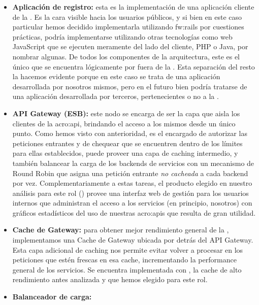 \begin{itemize}
  \item \textbf{Aplicación de registro:} esta es la implementación de una aplicación cliente de la {\cloud}. Es la cara visible hacia los usuarios públicos, y si bien en este caso particular hemos decidido implementarla utilizando \gls{fw:rails} por cuestiones prácticas, podría implementarse utilizando otras tecnologías como  web JavaScript que se ejecuten meramente del lado del cliente, PHP o Java, por nombrar algunas. De todos los componentes de la arquitectura, este es el único que se encuentra lógicamente por fuera de la {\cloud}. Esta separación del resto la hacemos evidente porque en este caso se trata de una aplicación desarrollada por nosotros mismos, pero en el futuro bien podría tratarse de una aplicación desarrollada por terceros, pertenecientes o no a la {\unlp}.

  \item \textbf{API Gateway (ESB):} este nodo se encarga de ser la capa que aisla los clientes de la \gls{acro:api}, brindando el acceso a los mismos desde un único punto. Como hemos visto con anterioridad, es el encargado de autorizar las peticiones entrantes y de chequear que se encuentren dentro de los límites para ellas establecidos, puede proveer una capa de caching intermedio, y también balancear la carga de los backends de servicios con un mecanismo de Round Robin que asigna una petición entrante \textit{no cacheada} a cada backend por vez. Complementariamente a estas tareas, el producto elegido en nuestro análisis para este rol () provee una interfaz web de gestión para los usuarios internos que administran el acceso a los servicios (en principio, nosotros) con gráficos estadísticos del uso de nuestras \glspl{acro:api} que resulta de gran utilidad.

  \item \textbf{Cache de Gateway:} para obtener mejor rendimiento general de la \cloud, implementamos una Cache de Gateway ubicada por detrás del API Gateway. Esta capa adicional de caching nos permite evitar volver a procesar en los  peticiones que estén frescas en esa cache, incrementando la performance general de los servicios. Se encuentra implementada con , la cache de alto rendimiento antes analizada y que hemos elegido para este rol.

  \item \textbf{Balanceador de carga:}


\end{itemize}
